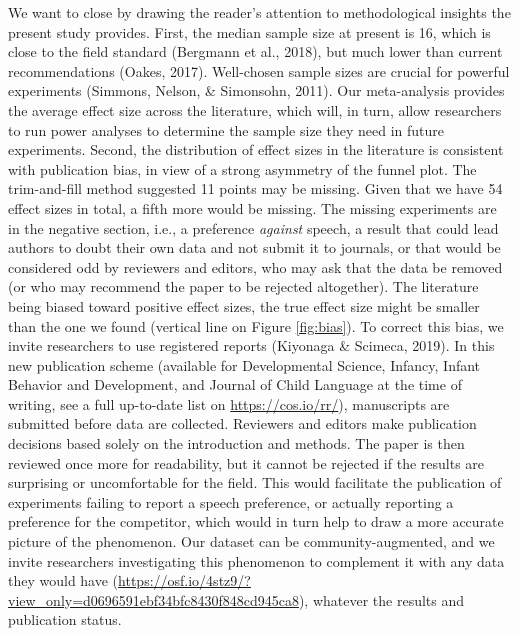 \documentclass[man]{apa6}
\begin{document}
We want to close by drawing the reader's attention to methodological insights the present study provides.
First, the median sample size at present is 16, which is close to the field standard (Bergmann et al., 2018), but much lower than current recommendations (Oakes, 2017). Well-chosen sample sizes are crucial for powerful experiments (Simmons, Nelson, \& Simonsohn, 2011). Our meta-analysis provides the average effect size across the literature, which will, in turn, allow researchers to run power analyses to determine the sample size they need in future experiments.
Second, the distribution of effect sizes in the literature is consistent with publication bias, in view of a strong asymmetry of the funnel plot. The trim-and-fill method suggested 11 points may be missing. Given that we have 54 effect sizes in total, a fifth more would be missing. The missing experiments are in the negative section, i.e., a preference \emph{against} speech, a result that could lead authors to doubt their own data and not submit it to journals, or that would be considered odd by reviewers and editors, who may ask that the data be removed (or who may recommend the paper to be rejected altogether). The literature being biased toward positive effect sizes, the true effect size might be smaller than the one we found (vertical line on Figure \ref{fig:bias}). To correct this bias, we invite researchers to use registered reports (Kiyonaga \& Scimeca, 2019). In this new publication scheme (available for Developmental Science, Infancy, Infant Behavior and Development, and Journal of Child Language at the time of writing, see a full up-to-date list on \url{https://cos.io/rr/}), manuscripts are submitted before data are collected. Reviewers and editors make publication decisions based solely on the introduction and methods. The paper is then reviewed once more for readability, but it cannot be rejected if the results are surprising or uncomfortable for the field. This would facilitate the publication of experiments failing to report a speech preference, or actually reporting a preference for the competitor, which would in turn help to draw a more accurate picture of the phenomenon. Our dataset can be community-augmented, and we invite researchers investigating this phenomenon to complement it with any data they would have (\url{https://osf.io/4stz9/?view_only=d0696591ebf34bfc8430f848cd945ca8}), whatever the results and publication status.
\end{document}
